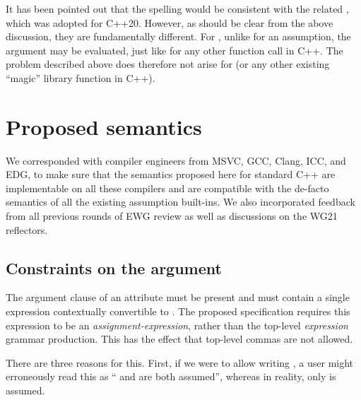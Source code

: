 It has been pointed out that the spelling  would be consistent with the related , which was adopted for C++20. However, as should be clear from the above discussion, they are fundamentally different. For ,  unlike for an assumption, the argument may be evaluated, just like for any other function call in C++. The problem described above does therefore not arise for  (or any other existing ``magic'' library function in C++).



\section{Proposed semantics}
\label{sec:semantics}

We corresponded with compiler engineers from MSVC, GCC, Clang, ICC, and EDG, to make sure that the semantics proposed here for standard C++ are implementable on all these compilers and are compatible with the de-facto semantics of all the existing assumption built-ins. We also incorporated feedback from all previous rounds of EWG review as well as discussions on the WG21 reflectors.

\subsection{Constraints on the argument}

The argument clause of an  attribute must be present and must contain a single expression contextually convertible to . %
The proposed specification requires this expression to be an \emph{assignment-expression}, rather than the top-level \emph{expression} grammar production. This has the effect that top-level commas are not allowed.

There are three reasons for this. First, if we were to allow writing , a user might erroneously read this as `` and  are both assumed'', whereas in reality, only  is assumed.

